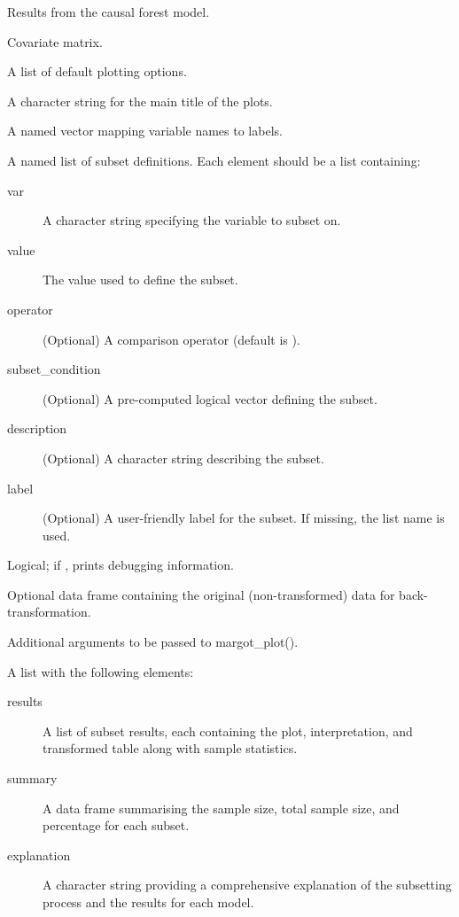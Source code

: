 \documentclass[a4paper]{book}
\begin{document}
\begin{Arguments}
\begin{ldescription}
\item[\code{model\_results}] Results from the causal forest model.

\item[\code{X}] Covariate matrix.

\item[\code{base\_defaults}] A list of default plotting options.

\item[\code{title}] A character string for the main title of the plots.

\item[\code{label\_mapping}] A named vector mapping variable names to labels.

\item[\code{subsets}] A named list of subset definitions. Each element should be a list containing:
\begin{description}

\item[var] A character string specifying the variable to subset on.
\item[value] The value used to define the subset.
\item[operator] (Optional) A comparison operator (default is ).
\item[subset\_condition] (Optional) A pre-computed logical vector defining the subset.
\item[description] (Optional) A character string describing the subset.
\item[label] (Optional) A user-friendly label for the subset. If missing, the list name is used.

\end{description}


\item[\code{debug}] Logical; if , prints debugging information.

\item[\code{original\_df}] Optional data frame containing the original (non-transformed) data for back-transformation.

\item[\code{...}] Additional arguments to be passed to margot\_plot().
\end{ldescription}
\end{Arguments}
%
\begin{Value}
A list with the following elements:
\begin{description}

\item[results] A list of subset results, each containing the plot, interpretation, and transformed table along with sample statistics.
\item[summary] A data frame summarising the sample size, total sample size, and percentage for each subset.
\item[explanation] A character string providing a comprehensive explanation of the subsetting process and the results for each model.

\end{description}

\end{Value}
\end{document}
